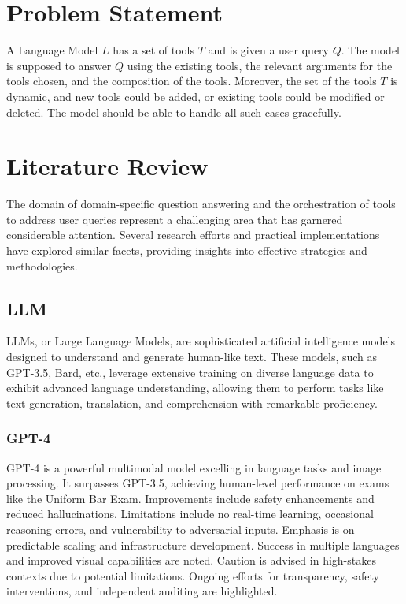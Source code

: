 \documentclass[10pt,twocolumn,letterpaper]{article}
\begin{document}
\section{Problem Statement}
A Language Model $L$ has a set of tools $T$ and is given a user query $Q$. The model is supposed to answer $Q$ using the existing tools, the relevant arguments for the tools chosen, and the composition of the tools. Moreover, the set of the tools $T$ is dynamic, and new tools could be added, or existing tools could be modified or deleted. The model should be able to handle all such cases gracefully.

\section{Literature Review}
The domain of domain-specific question answering and the orchestration of tools to address user queries represent a challenging area that has garnered considerable attention. Several research efforts and practical implementations have explored similar facets, providing insights into effective strategies and methodologies. 
\subsection{LLM}
LLMs, or Large Language Models, are sophisticated artificial intelligence models designed to understand and generate human-like text. These models, such as GPT-3.5, Bard, etc., leverage extensive training on diverse language data to exhibit advanced language understanding, allowing them to perform tasks like text generation, translation, and comprehension with remarkable proficiency.
\subsubsection{GPT-4 \cite{openai2023gpt4}}
GPT-4 is a powerful multimodal model excelling in language tasks and image processing. It surpasses GPT-3.5, achieving human-level performance on exams like the Uniform Bar Exam. Improvements include safety enhancements and reduced hallucinations. Limitations include no real-time learning, occasional reasoning errors, and vulnerability to adversarial inputs. Emphasis is on predictable scaling and infrastructure development. Success in multiple languages and improved visual capabilities are noted. Caution is advised in high-stakes contexts due to potential limitations. Ongoing efforts for transparency, safety interventions, and independent auditing are highlighted.
\end{document}
